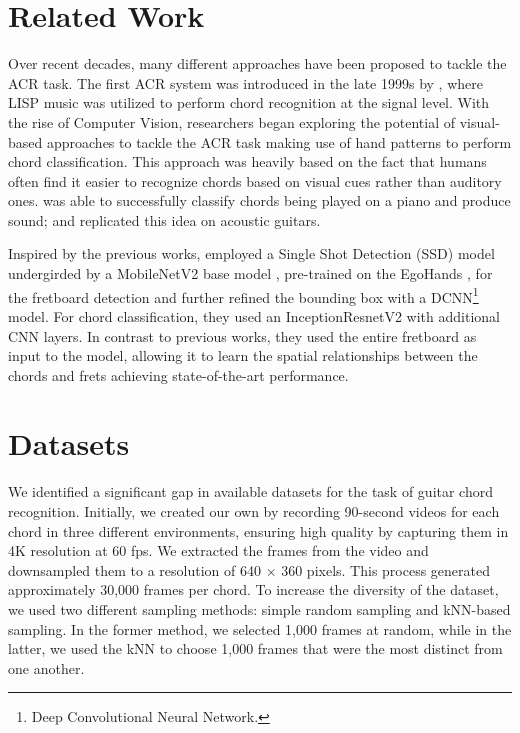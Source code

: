 \documentclass[10pt,twocolumn,letterpaper]{article}
\begin{document}

\section{Related Work}
Over recent decades, many different approaches have been proposed to tackle the ACR task. The first ACR system was introduced in the late 1999s by \cite{takuya1999realtime}, where LISP music was utilized to perform chord recognition at the signal level. With the rise of Computer Vision, researchers began exploring the potential of visual-based approaches to tackle the ACR task making use of hand patterns to perform chord classification. This approach was heavily based on the fact that humans often find it easier to recognize chords based on visual cues rather than auditory ones. \cite{su2020audeo} was able to successfully classify chords being played on a piano and produce sound; \cite{tran2019cnn} and \cite{ooaku2018guitar} replicated this idea on acoustic guitars.

Inspired by the previous works, \cite{Kristian_Zaman_Tenoyo_Jodhinata_2024} employed a Single Shot Detection (SSD) model undergirded by a MobileNetV2 base  model \cite{sandler2018mobilenetv2},  pre-trained on the EgoHands \cite{Bambach_2015_ICCV}, for the fretboard detection and further refined the bounding box with a DCNN\footnote{Deep Convolutional Neural Network.} model. For chord classification, they used an InceptionResnetV2 with additional CNN layers. In contrast to previous works, they used the entire fretboard as input to the model, allowing it to learn the spatial relationships between the chords and frets achieving state-of-the-art performance.

\section{Datasets}
We identified a significant gap in available datasets for the task of guitar chord recognition. Initially, we created our own by recording 90-second videos for each chord in three different environments, ensuring high quality by capturing them in 4K resolution at 60 fps. We extracted the frames from the video and downsampled them to a resolution of 640 $\times$ 360 pixels. This process generated approximately 30,000 frames per chord. To increase the diversity of the dataset, we used two different sampling methods: simple random sampling and kNN-based sampling. In the former method, we selected 1,000 frames at random, while in the latter, we used the kNN to choose 1,000 frames that were the most distinct from one another.
\end{document}
